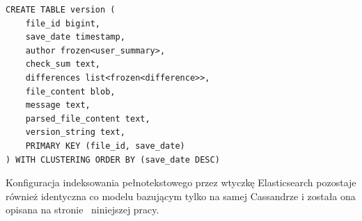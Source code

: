 \begin{minipage}{\linewidth}
\begin{lstlisting}[language=CQL,caption={Definicja tabeli \textit{version} w modelu hybrydowym},label={lst:cassandraHybridVersionTable}]
CREATE TABLE version (
    file_id bigint,
    save_date timestamp,
    author frozen<user_summary>,
    check_sum text,
    differences list<frozen<difference>>,
    file_content blob,
    message text,
    parsed_file_content text,
    version_string text,
    PRIMARY KEY (file_id, save_date)
) WITH CLUSTERING ORDER BY (save_date DESC)
\end{lstlisting}
\end{minipage}

Konfiguracja indeksowania pełnotekstowego przez wtyczkę Elasticsearch pozostaje również identyczna co modelu bazującym tylko na samej Cassandrze i została ona opisana na stronie~\pageref{sec:cassandraTextIndexConfig} niniejszej pracy.

